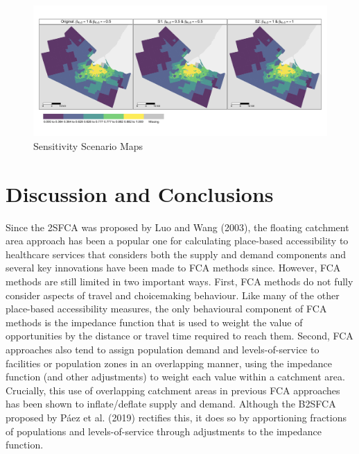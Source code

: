 \documentclass[]{elsarticle} %
\begin{document}
\begin{figure}
\includegraphics[width=1\linewidth]{./img/sensitivity_maps} \caption{\label{fig:sensitivity_maps}Sensitivity Scenario Maps}\label{fig:fig 9 sensitivity_maps}
\end{figure}

\hypertarget{discussion-and-conclusions}{%
\section{Discussion and Conclusions}\label{discussion-and-conclusions}}

Since the 2SFCA was proposed by Luo and Wang (2003), the floating
catchment area approach has been a popular one for calculating
place-based accessibility to healthcare services that considers both the
supply and demand components and several key innovations have been made
to FCA methods since. However, FCA methods are still limited in two
important ways. First, FCA methods do not fully consider aspects of
travel and choicemaking behaviour. Like many of the other place-based
accessibility measures, the only behavioural component of FCA methods is
the impedance function that is used to weight the value of opportunities
by the distance or travel time required to reach them. Second, FCA
approaches also tend to assign population demand and levels-of-service
to facilities or population zones in an overlapping manner, using the
impedance function (and other adjustments) to weight each value within a
catchment area. Crucially, this use of overlapping catchment areas in
previous FCA approaches has been shown to inflate/deflate supply and
demand. Although the B2SFCA proposed by Páez et al. (2019) rectifies
this, it does so by apportioning fractions of populations and
levels-of-service through adjustments to the impedance function.
\end{document}
